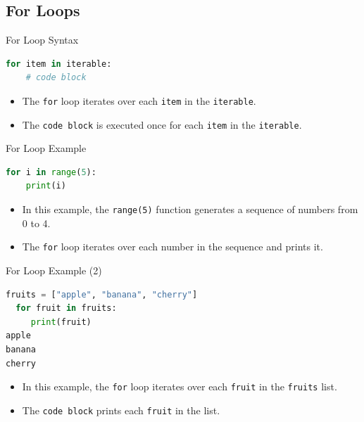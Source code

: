 \subsection{For Loops}
\begin{frame}[fragile]{For Loop Syntax}
    \begin{lstlisting}[language=Python]
for item in iterable:
    # code block
    \end{lstlisting}
    \begin{itemize}
        \item The \texttt{for} loop iterates over each \texttt{item} in the \texttt{iterable}.
        \item The \texttt{code block} is executed once for each \texttt{item} in the \texttt{iterable}.
    \end{itemize}
\end{frame}

\begin{frame}[fragile]{For Loop Example}
    \begin{lstlisting}[language=Python]
for i in range(5):
    print(i)
    \end{lstlisting}
    \begin{itemize}
        \item In this example, the \texttt{range(5)} function generates a sequence of numbers from 0 to 4.
        \item The \texttt{for} loop iterates over each number in the sequence and prints it.
    \end{itemize}
\end{frame}

\begin{frame}[fragile]{For Loop Example (2)}
    \begin{lstlisting}[language=Python]
  fruits = ["apple", "banana", "cherry"]
  for fruit in fruits:
     print(fruit)
apple
banana
cherry
    \end{lstlisting}
    \begin{itemize}
        \item In this example, the \texttt{for} loop iterates over each \texttt{fruit} in the \texttt{fruits} list.
        \item The \texttt{code block} prints each \texttt{fruit} in the list.
    \end{itemize}
\end{frame}

